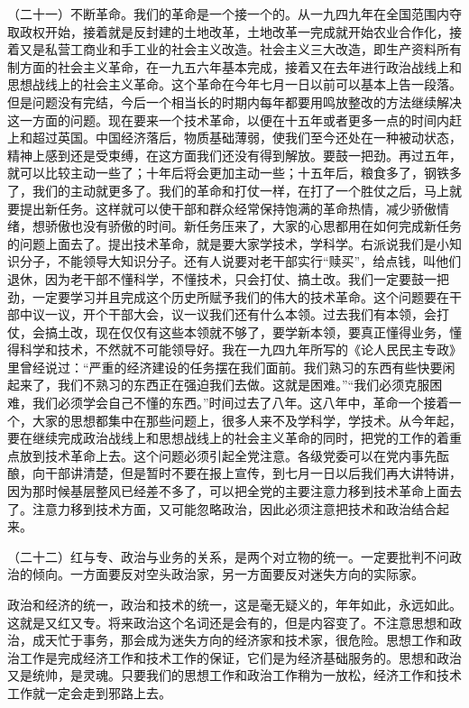 （二十一）不断革命。我们的革命是一个接一个的。从一九四九年在全国范围内夺取政权开始，接着就是反封建的土地改革，土地改革一完成就开始农业合作化，接着又是私营工商业和手工业的社会主义改造。社会主义三大改造，即生产资料所有制方面的社会主义革命，在一九五六年基本完成，接着又在去年进行政治战线上和思想战线上的社会主义革命。这个革命在今年七月一日以前可以基本上告一段落。但是问题没有完结，今后一个相当长的时期内每年都要用鸣放整改的方法继续解决这一方面的问题。现在要来一个技术革命，以便在十五年或者更多一点的时间内赶上和超过英国。中国经济落后，物质基础薄弱，使我们至今还处在一种被动状态，精神上感到还是受束缚，在这方面我们还没有得到解放。要鼓一把劲。再过五年，就可以比较主动一些了；十年后将会更加主动一些；十五年后，粮食多了，钢铁多了，我们的主动就更多了。我们的革命和打仗一样，在打了一个胜仗之后，马上就要提出新任务。这样就可以使干部和群众经常保持饱满的革命热情，减少骄傲情绪，想骄傲也没有骄傲的时间。新任务压来了，大家的心思都用在如何完成新任务的问题上面去了。提出技术革命，就是要大家学技术，学科学。右派说我们是小知识分子，不能领导大知识分子。还有人说要对老干部实行“赎买”，给点钱，叫他们退休，因为老干部不懂科学，不懂技术，只会打仗、搞土改。我们一定要鼓一把劲，一定要学习并且完成这个历史所赋予我们的伟大的技术革命。这个问题要在干部中议一议，开个干部大会，议一议我们还有什么本领。过去我们有本领，会打仗，会搞土改，现在仅仅有这些本领就不够了，要学新本领，要真正懂得业务，懂得科学和技术，不然就不可能领导好。我在一九四九年所写的《论人民民主专政》里曾经说过：“严重的经济建设的任务摆在我们面前。我们熟习的东西有些快要闲起来了，我们不熟习的东西正在强迫我们去做。这就是困难。”“我们必须克服困难，我们必须学会自己不懂的东西。”时间过去了八年。这八年中，革命一个接着一个，大家的思想都集中在那些问题上，很多人来不及学科学，学技术。从今年起，要在继续完成政治战线上和思想战线上的社会主义革命的同时，把党的工作的着重点放到技术革命上去。这个问题必须引起全党注意。各级党委可以在党内事先酝酿，向干部讲清楚，但是暂时不要在报上宣传，到七月一日以后我们再大讲特讲，因为那时候基层整风已经差不多了，可以把全党的主要注意力移到技术革命上面去了。注意力移到技术方面，又可能忽略政治，因此必须注意把技术和政治结合起来。

（二十二）红与专、政治与业务的关系，是两个对立物的统一。一定要批判不问政治的倾向。一方面要反对空头政治家，另一方面要反对迷失方向的实际家。

政治和经济的统一，政治和技术的统一，这是毫无疑义的，年年如此，永远如此。这就是又红又专。将来政治这个名词还是会有的，但是内容变了。不注意思想和政治，成天忙于事务，那会成为迷失方向的经济家和技术家，很危险。思想工作和政治工作是完成经济工作和技术工作的保证，它们是为经济基础服务的。思想和政治又是统帅，是灵魂。只要我们的思想工作和政治工作稍为一放松，经济工作和技术工作就一定会走到邪路上去。

